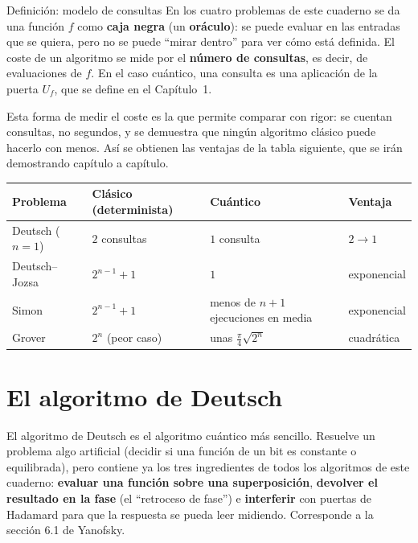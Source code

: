 \documentclass[11pt, a4paper, twoside, openright]{report}
\begin{document}
\begin{teoria}{Definición: modelo de consultas}
En los cuatro problemas de este cuaderno se da una función $f$ como \textbf{caja negra} (un \textbf{oráculo}): se puede evaluar en las entradas que se quiera, pero no se puede ``mirar dentro'' para ver cómo está definida. El coste de un algoritmo se mide por el \textbf{número de consultas}, es decir, de evaluaciones de $f$. En el caso cuántico, una consulta es una aplicación de la puerta $U_f$, que se define en el Capítulo~1.
\end{teoria}

\noindent Esta forma de medir el coste es la que permite comparar con rigor: se cuentan consultas, no segundos, y se demuestra que ningún algoritmo clásico puede hacerlo con menos. Así se obtienen las ventajas de la tabla siguiente, que se irán demostrando capítulo a capítulo.

\begin{center}
\small\renewcommand{\arraystretch}{1.25}
\begin{tabular}{l|l|l|l}
\textbf{Problema} & \textbf{Clásico (determinista)} & \textbf{Cuántico} & \textbf{Ventaja} \\ \hline
Deutsch ($n=1$) & $2$ consultas & $1$ consulta & $2 \to 1$ \\
Deutsch--Jozsa & $2^{n-1}+1$ & $1$ & exponencial \\
Simon & $2^{n-1}+1$ & menos de $n+1$ ejecuciones en media & exponencial \\
Grover & $2^n$ (peor caso) & unas $\frac{\pi}{4}\sqrt{2^n}$ & cuadrática
\end{tabular}
\end{center}

\chapter{El algoritmo de Deutsch}

\noindent El algoritmo de Deutsch \cite{deutsch1985, cleve1998} es el algoritmo cuántico más sencillo. Resuelve un problema algo artificial (decidir si una función de un bit es constante o equilibrada), pero contiene ya los tres ingredientes de todos los algoritmos de este cuaderno: \textbf{evaluar una función sobre una superposición}, \textbf{devolver el resultado en la fase} (el ``retroceso de fase'') e \textbf{interferir} con puertas de Hadamard para que la respuesta se pueda leer midiendo. Corresponde a la sección 6.1 de Yanofsky.
\end{document}
